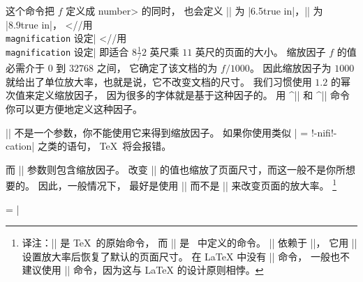 这个命令把 $f$ 定义成 \<number> 的同时，
也会定义 |\hsize| 为 |6.5true in|，|\vsize| 为 |8.9true in|，
^^|\hsize//用 {\tt\\magnification} 设定|
^^|\vsize//用 {\tt\\magnification} 设定|
即适合 $8 \frac1/2$ 英尺乘 $11$ 英尺的页面的大小。
缩放因子 $f$ 的值必需介于 $0$ 到 $32768$ 之间，
它确定了该文档的为 $f/1000$。
因此缩放因子为 $1000$ 就给出了单位放大率，也就是说，它不改变文档的尺寸。
我们习惯使用 $1.2$ 的幂次值来定义缩放因子，
因为很多的字体就是基于这种因子的。
用 ^|\magstep| 和 ^|\magstephalf| 命令你可以更方便地定义这种因子。

|\magnification| 不是一个参数，你不能使用它来得到缩放因子。
如果你使用类似 | = \mag!-nifi!-cation| 之类的语句，
\TeX\ 将会报错。

而 |\mag| 参数则包含缩放因子。
改变 |\mag| 的值也缩放了页面尺寸，而这一般不是你所想要的。
因此，一般情况下，
最好是使用 |\magnification| 而不是 |\mag| 来改变页面的放大率。%
\footnote{译注：|\mag| 是 \TeX\ 的原始命令，
而 |\magnification| 是 \plainTeX\ 中定义的命令。
|\magnification| 依赖于 |\mag|，
它用 |\mag| 设置放大率后恢复了默认的页面尺寸。
在 LaTeX 中没有 |\magnification| 命令，
一般也不建议使用 |\mag| 命令，因为这与 LaTeX 的设计原则相悖。
}

\example
\magnification = 
|
\endexample
\enddesc


